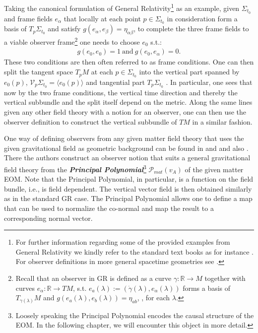 Taking the canonical formulation of General Relativity\footnote{For further information regarding some of the provided examples from General Relativity we kindly refer to the standard text books as for instance \cite{Misner1973}. For observer definitions in more general spacetime geometries see \cite{2011PhRvD..83d4047R}.} as an example, given $\Sigma_{t_0}$ and frame fields $e_{\alpha}$ that locally at each point $p \in \Sigma_{t_0}$ in consideration form a basis of $T_p\Sigma_{t_0}$ and satisfy $g(e_{\alpha},e_{\beta}) = \eta_{\alpha \beta}$, to complete the three frame fields to a viable observer frame\footnote{Recall that an observer in GR is defined as a curve $\gamma : \mathbb{R} \rightarrow M$ together with curves $e_{\alpha} : \mathbb{R} \rightarrow TM$, s.t. $ e_a(\lambda) :=(\dot{\gamma}(\lambda),e_{\alpha}(\lambda))$ forms a basis of $T_{\gamma(\lambda)}M$ and $g(e_a(\lambda),e_b(\lambda)) = \eta_{ab}$, , for each $\lambda$.} one needs to choose $e_0$ s.t.:
\begin{align}
    g(e_0,e_0) = 1 \ \text{and} \ g(e_0,e_{\alpha}) = 0.
\end{align}
These two conditions are then often referred to as frame conditions. One can then split the tangent space $T_pM$ at each $p \in \Sigma_{t_0}$ into the vertical part spanned by $e_0(p)$,  $\mathcal{V}_p\Sigma_{t_0} = \langle  e_0(p) \rangle$ and tangential part $T_p\Sigma_{t_0}$ . In particular, one sees that now by the two frame conditions, the vertical time direction and thereby the vertical subbundle and the split itself depend on the metric. Along the same lines given any other field theory with a notion for an observer, one can then use the observer definition to construct the vertical subbundle of $TM$ in a similar fashion. 

One way of defining observers from any given matter field theory that uses the given gravitational field as geometric background can be found in \cite{2018PhRvD..97h4036D} and \cite{2011PhRvD..83d4047R} and also \cite{Rivera}. There the authors construct an observer notion that suits a general gravitational field theory from the \textbf{\textit{Principal Polynomial}}\footnote{Loosely speaking the Principal Polynomial encodes the causal structure of the EOM. In the following chapter, we will encounter this object in more detail.} $\mathcal{P}_{mat}(v_A)$ of the given matter EOM. Note that the Principal Polynomial, in particular, is a function on the field bundle, i.e., is field dependent. The vertical vector field is then obtained similarly as in the standard GR case. The Principal Polynomial allows one to define a map that can be used to normalize the co-normal and map the result to a corresponding normal vector.

